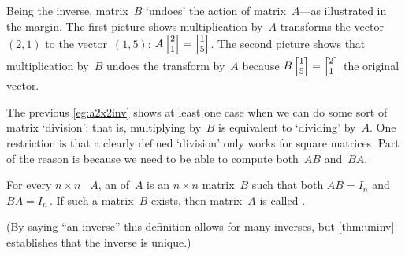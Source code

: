 \begin{example}
\begin{solution}
Being the inverse, matrix~\(B\) `undoes' the action of matrix~\(A\)---as illustrated in the margin.
The first picture shows multiplication by~\(A\) transforms the vector~\((2,1)\) to the vector~\((1,5)\): \(A\footnotesize\begin{bmatrix} 2\\1 \end{bmatrix}=\begin{bmatrix} 1\\5 \end{bmatrix}\).
The second picture shows that multiplication by~\(B\) undoes the transform by~\(A\) because \(B\footnotesize\begin{bmatrix} 1\\5 \end{bmatrix}=\begin{bmatrix} 2\\1 \end{bmatrix}\) the original vector.
%
\end{solution}
\end{example}

The previous \autoref{eg:a2x2inv} shows at least one case when we can do some sort of matrix `division': that is, multiplying by~\(B\) is equivalent to `dividing' by~\(A\).
One restriction is that a clearly defined `division' only works for square matrices.
Part of the reason is because we need to be able to compute both~\(AB\) and~\(BA\).


\begin{definition}[inverse] \label{def:invertible} 
For every \(n\times n\) ~\(A\), an  of~\(A\) is an \(n\times n\) matrix~\(B\) such that both \(AB=I_n\) and \(BA=I_n\)\,.
If such a matrix~\(B\) exists, then matrix~\(A\) is called .
\end{definition}

(By saying ``an inverse'' this definition allows for many inverses, but \autoref{thm:uninv} establishes that the inverse is unique.)


